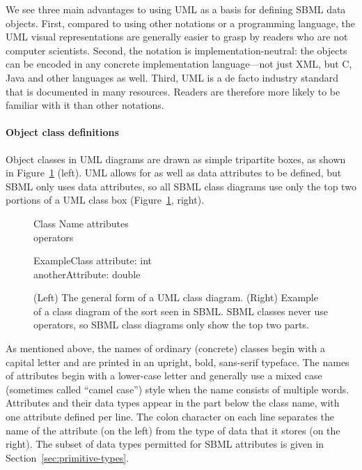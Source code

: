 We see three main advantages to using UML as a basis for defining
SBML data objects.  First, compared to using other notations or
a programming language, the UML visual representations are
generally easier to grasp by readers who are not computer
scientists.  Second, the notation is implementation-neutral: the
objects can be encoded in any concrete implementation
language---not just XML, but C, Java and other languages as well.
Third, UML is a de facto industry standard that is documented in
many resources.  Readers are therefore more likely to be familiar
with it than other notations.


\paragraph{Object class definitions}

Object classes in UML diagrams are drawn as simple tripartite
boxes, as shown in Figure~\ref{fig:simple-class-eg} (left).  UML
allows for  as well as data attributes to be defined,
but SBML only uses data attributes, so all SBML class diagrams use
only the top two portions of a UML class box
(Figure~\ref{fig:simple-class-eg}, right).

\begin{figure}[htb]
  \centering
  \small
  \begin{classbox}{Class Name}
    attributes\\
    \hline
    operators\\
  \end{classbox}
  \quad  \quad  \quad  \quad
  \begin{classbox}{ExampleClass}
    attribute: int \\
    anotherAttribute: double\\
  \end{classbox}
  \caption{(Left) The general form of a UML class
      diagram.  (Right) Example of a class diagram of the sort
      seen in SBML.  SBML classes never use operators, so SBML
      class diagrams only show the top two parts.}
  \label{fig:simple-class-eg}
\end{figure}

As mentioned above, the names of ordinary (concrete) classes begin
with a capital letter and are printed in an upright,
bold, sans-serif typeface.  The names of attributes
begin with a lower-case letter and generally use a mixed case
(sometimes called ``camel case'') style when the name consists of
multiple words.  Attributes and their data types appear in the
part below the class name, with one attribute defined per line.
The colon character on each line separates the name of the
attribute (on the left) from the type of data that it stores (on
the right).  The subset of data types permitted for SBML
attributes is given in Section~\ref{sec:primitive-types}.

